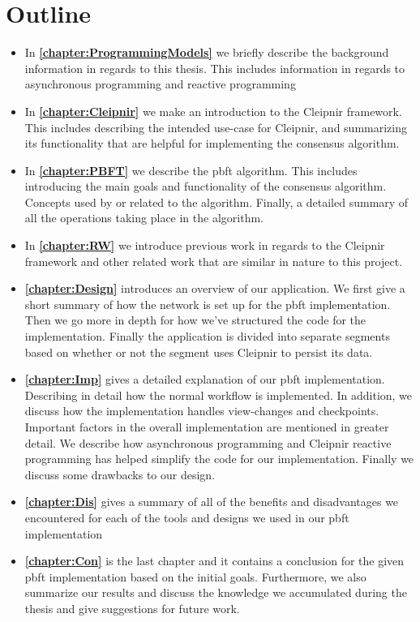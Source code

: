 \section{Outline}
\begin{itemize}
\item In \textbf{\autoref{chapter:ProgrammingModels}} we briefly describe the background information in regards to this thesis. This includes information in regards to asynchronous programming and reactive programming

\item In \textbf{\autoref{chapter:Cleipnir}} we make an introduction to the Cleipnir framework. This includes describing the intended use-case for Cleipnir, and summarizing its functionality that are helpful for implementing the consensus algorithm.

\item In \textbf{\autoref{chapter:PBFT}} we describe the \ac{pbft} algorithm. This includes introducing the main goals and functionality of the consensus algorithm. Concepts used by or related to the algorithm. Finally, a detailed summary of all the operations taking place in the algorithm.

\item In \textbf{\autoref{chapter:RW}} we introduce previous work in regards to the Cleipnir framework and other related work that are similar in nature to this project.

\item \textbf{\autoref{chapter:Design}} introduces an overview of our application. We first give a short summary of how the network is set up for the \ac{pbft} implementation. Then we go more in depth for how we’ve structured the code for the implementation. Finally the application is divided into separate segments based on whether or not the segment uses Cleipnir to persist its data.

\item \textbf{\autoref{chapter:Imp}} gives a detailed explanation of our \ac{pbft} implementation. Describing in detail how the normal workflow is implemented. In addition, we discuss how the implementation handles view-changes and checkpoints.  Important factors in the overall implementation are mentioned in greater detail. We describe how asynchronous programming and Cleipnir reactive programming has helped simplify the code for our implementation. Finally we discuss some drawbacks to our design.

\item \textbf{\autoref{chapter:Dis}} gives a summary of all of the benefits and disadvantages we encountered for each of the tools and designs we used in our \ac{pbft} implementation %

\item \textbf{\autoref{chapter:Con}} is the last chapter and it contains a conclusion for the given \ac{pbft} implementation based on the initial goals. Furthermore, we also summarize our results and discuss the knowledge we accumulated during the thesis and give suggestions for future work.
\end{itemize}